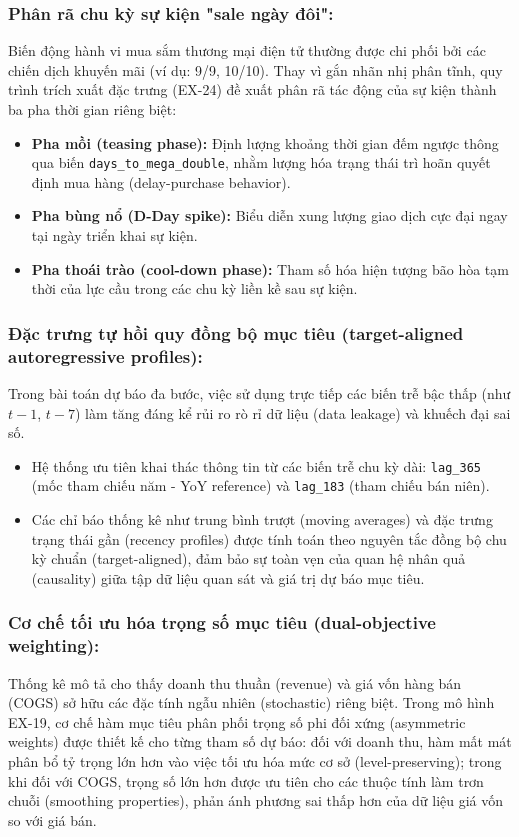 \documentclass{article}
\begin{document}
\subsubsection{Phân rã chu kỳ sự kiện "sale ngày đôi":}
Biến động hành vi mua sắm thương mại điện tử thường được chi phối bởi các chiến dịch khuyến mãi (ví dụ: 9/9, 10/10). Thay vì gắn nhãn nhị phân tĩnh, quy trình trích xuất đặc trưng (EX-24) đề xuất phân rã tác động của sự kiện thành ba pha thời gian riêng biệt:
\begin{itemize}[noitemsep,leftmargin=1.2em]
    \item \textbf{Pha mồi (teasing phase):} Định lượng khoảng thời gian đếm ngược thông qua biến \texttt{days\_to\_mega\_double}, nhằm lượng hóa trạng thái trì hoãn quyết định mua hàng (delay-purchase behavior).
    \item \textbf{Pha bùng nổ (D-Day spike):} Biểu diễn xung lượng giao dịch cực đại ngay tại ngày triển khai sự kiện.
    \item \textbf{Pha thoái trào (cool-down phase):} Tham số hóa hiện tượng bão hòa tạm thời của lực cầu trong các chu kỳ liền kề sau sự kiện.
\end{itemize}

\subsubsection{Đặc trưng tự hồi quy đồng bộ mục tiêu (target-aligned autoregressive profiles):}
Trong bài toán dự báo đa bước, việc sử dụng trực tiếp các biến trễ bậc thấp (như $t-1$, $t-7$) làm tăng đáng kể rủi ro rò rỉ dữ liệu (data leakage) và khuếch đại sai số.
\begin{itemize}[noitemsep,leftmargin=1.2em]
    \item Hệ thống ưu tiên khai thác thông tin từ các biến trễ chu kỳ dài: \texttt{lag\_365} (mốc tham chiếu năm - YoY reference) và \texttt{lag\_183} (tham chiếu bán niên).
    \item Các chỉ báo thống kê như trung bình trượt (moving averages) và đặc trưng trạng thái gần (recency profiles) được tính toán theo nguyên tắc đồng bộ chu kỳ chuẩn (target-aligned), đảm bảo sự toàn vẹn của quan hệ nhân quả (causality) giữa tập dữ liệu quan sát và giá trị dự báo mục tiêu.
\end{itemize}

\subsubsection{Cơ chế tối ưu hóa trọng số mục tiêu (dual-objective weighting):}
Thống kê mô tả cho thấy doanh thu thuần (revenue) và giá vốn hàng bán (COGS) sở hữu các đặc tính ngẫu nhiên (stochastic) riêng biệt. Trong mô hình EX-19, cơ chế hàm mục tiêu phân phối trọng số phi đối xứng (asymmetric weights) được thiết kế cho từng tham số dự báo: đối với doanh thu, hàm mất mát phân bổ tỷ trọng lớn hơn vào việc tối ưu hóa mức cơ sở (level-preserving); trong khi đối với COGS, trọng số lớn hơn được ưu tiên cho các thuộc tính làm trơn chuỗi (smoothing properties), phản ánh phương sai thấp hơn của dữ liệu giá vốn so với giá bán.
\end{document}
